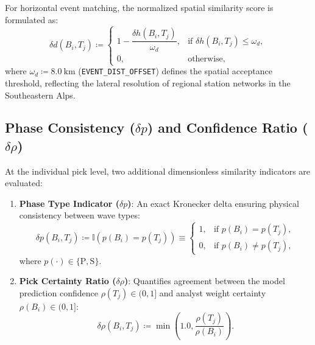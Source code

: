 For horizontal event matching, the normalized spatial similarity
score is formulated as:
\begin{equation}
  \delta d(B_i, T_j) \coloneqq
  \begin{cases}
    1 - \dfrac{\delta h(B_i, T_j)}{\omega_d}, & \text{if } \delta
    h(B_i, T_j) \le \omega_d, \\[8pt]
    0, & \text{otherwise},
  \end{cases}
\end{equation}
where $\omega_d \coloneqq \qty{8.0}{\kilo\meter}$
(\texttt{EVENT\_DIST\_OFFSET})
defines the spatial acceptance threshold, reflecting the lateral
resolution of regional station networks in the Southeastern Alps.

\subsection{Phase Consistency (\texorpdfstring{$\delta p$}{delta p})
and Confidence Ratio (\texorpdfstring{$\delta \rho$}{delta rho})}
At the individual pick level, two additional dimensionless
similarity indicators are evaluated:
\begin{enumerate}
  \item \textbf{Phase Type Indicator ($\delta p$)}: An exact
    Kronecker delta ensuring physical consistency between wave types:
    \begin{equation}
      \delta p(B_i, T_j) \coloneqq \mathbb{I}\left( p(B_i) = p(T_j)
      \right) \equiv
      \begin{cases}
        1, & \text{if } p(B_i) = p(T_j), \\
        0, & \text{if } p(B_i) \neq p(T_j),
      \end{cases}
    \end{equation}
    where $p( \cdot ) \in \{\mathrm{P}, \mathrm{S}\}$.
  \item \textbf{Pick Certainty Ratio ($\delta \rho$)}: Quantifies
    agreement between the model prediction confidence $\rho(T_j) \in
    (0, 1]$ and analyst weight certainty $\rho(B_i) \in (0, 1]$:
    \begin{equation}
      \delta \rho(B_i, T_j) \coloneqq \min\left( \num{1.0},
      \frac{\rho(T_j)}{\rho(B_i)} \right).
    \end{equation}
\end{enumerate}


